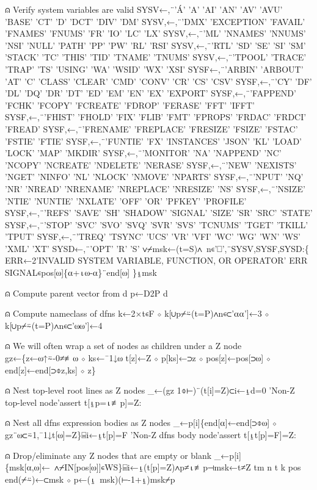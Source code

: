 \documentclass{article}%
\begin{document}
⍝ Verify system variables are valid
         SYSV←,¨'Á' 'A' 'AI' 'AN' 'AV' 'AVU' 'BASE' 'CT' 'D' 'DCT' 'DIV' 'DM'
         SYSV,←,¨'DMX' 'EXCEPTION' 'FAVAIL' 'FNAMES' 'FNUMS' 'FR' 'IO' 'LC' 'LX'
         SYSV,←,¨'ML' 'NNAMES' 'NNUMS' 'NSI' 'NULL' 'PATH' 'PP' 'PW' 'RL' 'RSI'
         SYSV,←,¨'RTL' 'SD' 'SE' 'SI' 'SM' 'STACK' 'TC' 'THIS' 'TID' 'TNAME' 'TNUMS'
         SYSV,←,¨'TPOOL' 'TRACE' 'TRAP' 'TS' 'USING' 'WA' 'WSID' 'WX' 'XSI'
         SYSF←,¨'ARBIN' 'ARBOUT' 'AT' 'C' 'CLASS' 'CLEAR' 'CMD' 'CONV' 'CR' 'CS' 'CSV'
         SYSF,←,¨'CY' 'DF' 'DL' 'DQ' 'DR' 'DT' 'ED' 'EM' 'EN' 'EX' 'EXPORT'
         SYSF,←,¨'FAPPEND' 'FCHK' 'FCOPY' 'FCREATE' 'FDROP' 'FERASE' 'FFT' 'IFFT'
         SYSF,←,¨'FHIST' 'FHOLD' 'FIX' 'FLIB' 'FMT' 'FPROPS' 'FRDAC' 'FRDCI' 'FREAD'
         SYSF,←,¨'FRENAME' 'FREPLACE' 'FRESIZE' 'FSIZE' 'FSTAC' 'FSTIE' 'FTIE'
         SYSF,←,¨'FUNTIE' 'FX' 'INSTANCES' 'JSON' 'KL' 'LOAD' 'LOCK' 'MAP' 'MKDIR'
         SYSF,←,¨'MONITOR' 'NA' 'NAPPEND' 'NC' 'NCOPY' 'NCREATE' 'NDELETE' 'NERASE'
         SYSF,←,¨'NEW' 'NEXISTS' 'NGET' 'NINFO' 'NL' 'NLOCK' 'NMOVE' 'NPARTS'
         SYSF,←,¨'NPUT' 'NQ' 'NR' 'NREAD' 'NRENAME' 'NREPLACE' 'NRESIZE' 'NS'
         SYSF,←,¨'NSIZE' 'NTIE' 'NUNTIE' 'NXLATE' 'OFF' 'OR' 'PFKEY' 'PROFILE'
         SYSF,←,¨'REFS' 'SAVE' 'SH' 'SHADOW' 'SIGNAL' 'SIZE' 'SR' 'SRC' 'STATE'
         SYSF,←,¨'STOP' 'SVC' 'SVO' 'SVQ' 'SVR' 'SVS' 'TCNUMS' 'TGET' 'TKILL' 'TPUT'
         SYSF,←,¨'TREQ' 'TSYNC' 'UCS' 'VR' 'VFI' 'WC' 'WG' 'WN' 'WS' 'XML' 'XT'
         SYSD←,¨'OPT' 'R' 'S'
         ∨⌿msk←(t=S)∧~n∊'⎕',¨SYSV,SYSF,SYSD:\{
                 ERR←2'INVALID SYSTEM VARIABLE, FUNCTION, OR OPERATOR'
                 ERR SIGNAL∊pos[⍵]\{⍺+⍳⍵-⍺\}¨end[⍵]
         \}⍸msk

⍝ Compute parent vector from d
         p←D2P d

⍝ Compute nameclass of dfns
         k←2×t∊F ⋄ k[∪p⌿⍨(t=P)∧n∊⊂'⍺⍺']←3 ⋄ k[∪p⌿⍨(t=P)∧n∊⊂'⍵⍵']←4

⍝ We will often wrap a set of nodes as children under a Z node
         gz←\{z←⍵↑⍨-0≠≢⍵ ⋄ ks←¯1↓⍵
                 t[z]←Z ⋄ p[ks]←⊃z ⋄ pos[z]←pos[⊃⍵] ⋄ end[z]←end[⊃⌽z,ks] ⋄ z\}

⍝ Nest top-level root lines as Z nodes
         _←(gz 1⌽⊢)¨(t[i]=Z)⊂i←⍸d=0
         'Non-Z top-level node'assert t[⍸p=⍳≢p]=Z:

⍝ Nest all dfns expression bodies as Z nodes
         _←p[i]\{end[⍺]←end[⊃⌽⍵] ⋄ gz¨⍵⊂⍨1,¯1↓t[⍵]=Z\}⌸i←⍸t[p]=F
         'Non-Z dfns body node'assert t[⍸t[p]=F]=Z:

⍝ Drop/eliminate any Z nodes that are empty or blank
         _←p[i]\{msk[⍺,⍵]←~∧⌿IN[pos[⍵]]∊WS\}⌸i←⍸(t[p]=Z)∧p≠⍳≢p⊣msk←t≠Z
         tm n t k pos end(⌿⍨)←⊂msk ⋄ p←(⍸~msk)(⊢-1+⍸)msk⌿p
\end{document}
